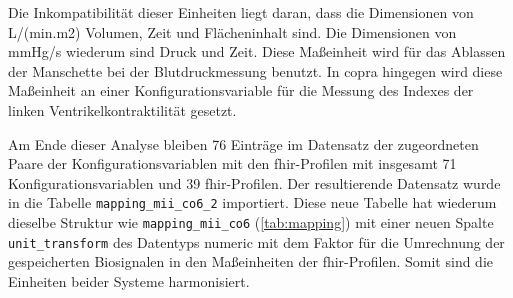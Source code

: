 Die Inkompatibilität dieser Einheiten liegt daran, dass die Dimensionen von L/(min.m2) Volumen, Zeit und Flächeninhalt sind. Die Dimensionen von mmHg/s wiederum sind Druck und Zeit. Diese Maßeinheit wird für das Ablassen der Manschette bei der Blutdruckmessung benutzt. In \ac{copra} hingegen wird diese Maßeinheit an einer Konfigurationsvariable für die Messung des Indexes der linken Ventrikelkontraktilität gesetzt.

Am Ende dieser Analyse bleiben 76 Einträge im Datensatz der zugeordneten Paare der Konfigurationsvariablen mit den \ac{fhir}-Profilen mit insgesamt 71 Konfigurationsvariablen und 39 \ac{fhir}-Profilen. Der resultierende Datensatz wurde in die Tabelle \texttt{mapping\_mii\_co6\_2} importiert. Diese neue Tabelle hat wiederum dieselbe Struktur wie \texttt{mapping\_mii\_co6} (\ref{tab:mapping}) mit einer neuen Spalte \texttt{unit\_transform} des Datentyps \glqq numeric\grqq{} mit dem Faktor für die Umrechnung der gespeicherten Biosignalen in den Maßeinheiten der \ac{fhir}-Profilen. Somit sind die Einheiten beider Systeme harmonisiert.